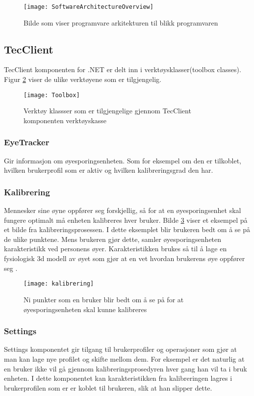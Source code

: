 \begin{figure}[ht!]
\centering
\texttt{[image: SoftwareArchitectureOverview]}
\caption{Bilde som viser programvare arkitekturen til blikk programvaren}
\label{fig:overview}
\end{figure}


\subsection{TecClient}

TecClient komponenten for .NET er delt inn i verktøysklasser(toolbox classes). Figur \ref{fig:toolbox} viser de ulike verktøyene som er tilgjengelig.

\begin{figure}[ht!]
\centering
\texttt{[image: Toolbox]}
\caption{Verktøy klassser som er tilgjengelige gjennom TecClient komponenten verktøyskasse}
\label{fig:toolbox}
\end{figure}


\subsubsection{EyeTracker} Gir informasjon om øyesporingsenheten. Som for eksempel om den er tilkoblet, hvilken brukerprofil som er aktiv og hvilken kalibreringsgrad den har.

\subsubsection{Kalibrering} 
Mennesker sine øyne oppfører seg forskjellig, så for at en øyesporingsenhet skal fungere optimalt må enheten kalibreres hver bruker.  Bilde \ref{fig:kalibre} viser et eksempel på et bilde fra kalibreringsprosessen. I dette eksemplet blir brukeren bedt om å se på de ulike punktene. Mens brukeren gjør dette, samler øyesporingsenheten karakteristikk ved personens øyer. Karakteristikken brukes så til å lage en fysiologisk 3d modell av øyet som gjør at en vet hvordan brukerens øye oppfører seg \cite{www.t5:online}. 

\begin{figure}[ht!]
\centering
\texttt{[image: kalibrering]}
\caption{Ni punkter som en bruker blir bedt om å se på for at øyesporingsenheten skal kunne kalibreres\cite{VHye88:online}}
\label{fig:kalibre}
\end{figure}


\subsubsection{Settings}
Settings komponentet gir tilgang til brukerprofiler og operasjoner som gjør at man kan lage nye profilet og skifte mellom dem. For eksempel er det naturlig at en bruker ikke vil gå gjennom kalibreringsprosedyren hver gang han vil ta i bruk enheten. I dette komponentet kan karakteristikken fra kalibreringen lagres i brukerprofilen som er er koblet til brukeren, slik at han slipper dette. 


